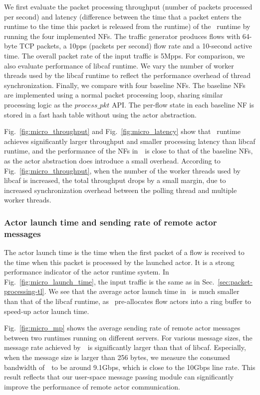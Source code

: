 We first evaluate the packet processing throughput (number of packets processed per second) and latency (difference between the time that a packet enters the runtime to the time this packet is released from the runtime) of the \nfactor~runtime by running the four implemented NFs. The traffic generator produces flows with 64-byte TCP packets, a 10pps (packets per second) flow rate and a 10-second active time. The overall packet rate of the input traffic is 5Mpps. For comparison, we also evaluate performance of libcaf runtime. We vary the number of worker threads used by the libcaf runtime to reflect the performance overhead of thread synchronization. Finally, we compare with four baseline NFs. The baseline NFs are implemented using a normal packet processing loop, sharing similar processing logic as the $process\_pkt$ API. The per-flow state in each baseline NF is stored in a fast hash table \cite{pagh2001cuckoo} without using the actor abstraction.

Fig.~\ref{fig:micro_throughput} and Fig.~\ref{fig:micro_latency} show that \nfactor~runtime achieves significantly larger throughput and smaller processing latency than libcaf runtime, and the performance of the NFs in~\nfactor~is close to that of the baseline NFs, as the actor abstraction does introduce a small overhead. According to Fig.~\ref{fig:micro_throughput}, when the number of the worker threads used by libcaf is increased, the total throughput drops by a small margin, due to increased synchronization overhead between the polling thread and multiple worker threads.



\subsubsection{Actor launch time and sending rate of remote actor messages}
\label{sec:srram}

The actor launch time is the time when the first packet of a flow is received to the time when this packet is processed by the launched actor. It is a strong performance indicator of the actor runtime system. In Fig.~\ref{fig:micro_launch_time}, the input traffic is the same as in Sec.~\ref{sec:packet-processing-tl}. We see that the average actor launch time in \nfactor~is much smaller than that of the libcaf runtime, as \nfactor~pre-allocates flow actors into a ring buffer to speed-up actor launch time.

Fig.~\ref{fig:micro_mp} shows the average sending rate of remote actor messages between two runtimes running on different servers. For various message sizes, the message rate achieved by~\nfactor~is significantly larger than that of libcaf. Especially, when the message size is larger than 256 bytes, we measure the consumed bandwidth of~\nfactor~to be around 9.1Gbps, which is close to the 10Gbps line rate. This result reflects that our user-space message passing module can significantly improve the performance of remote actor communication.

